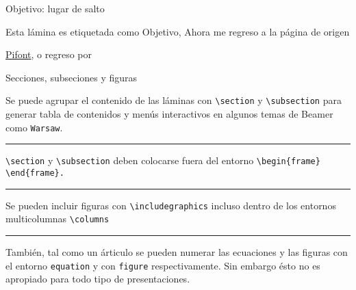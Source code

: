 \documentclass{beamer}
\begin{document}


\begin{frame}[label=Objetivo]{Objetivo: lugar de salto}

Esta lámina es etiquetada como Objetivo, Ahora me regreso a la página de origen

\hyperlink{regreso}{Pifont},  o regreso por \hyperlink{regreso}{}

\end{frame}



\begin{frame}{Secciones, subseciones y figuras}

Se puede agrupar el contenido de las láminas con {\tt \textbackslash section}  y {\tt \textbackslash subsection} para
generar tabla de contenidos y menús interactivos en algunos temas de Beamer como {\tt Warsaw}.

\vspace{0.2cm} %

\noindent\rule{\textwidth}{0.4pt}

\vspace{0.2cm} %

{\tt \textbackslash section}  y {\tt \textbackslash subsection} deben colocarse fuera del entorno {\tt \textbackslash begin\{frame\} \textbackslash end\{frame\}. }

\vspace{0.2cm} %

\noindent\rule{2cm}{0.4pt}

\vspace{0.2cm} %

Se pueden incluir figuras con {\tt \textbackslash includegraphics} incluso dentro de los entornos multicolumnas {\tt \textbackslash columns}

\vspace{0.2cm} %

\noindent\rule{\textwidth}{0.8pt}

\vspace{0.2cm} %

También, tal como un árticulo se pueden numerar las ecuaciones y las figuras con el entorno {\tt equation} y con {\tt figure} respectivamente. Sin embargo ésto no es apropiado para todo tipo de presentaciones.
 
\end{frame}
\end{document}
